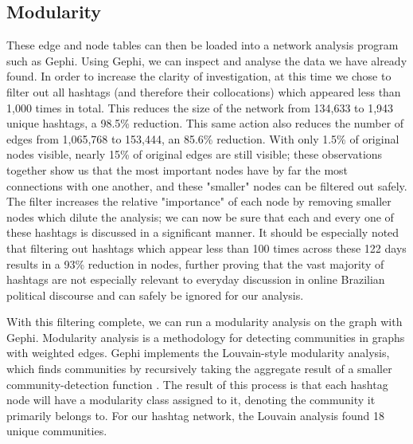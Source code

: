 \documentclass[a4paper,11pt]{article}  %
\begin{document}
	\subsection{Modularity}
	\label{subsec:modularity}
	These edge and node tables can then be loaded into a network analysis program such as Gephi\parencite{GephiOpenGraph}. Using Gephi, we can inspect and analyse the data we have already found. In order to increase the clarity of investigation, at this time we chose to filter out all hashtags (and therefore their collocations) which appeared less than 1,000 times in total. This reduces the size of the network from 134,633 to 1,943 unique hashtags, a 98.5\% reduction. This same action also reduces the number of edges from 1,065,768 to 153,444, an 85.6\% reduction. With only 1.5\% of original nodes visible, nearly 15\% of original edges are still visible; these observations together show us that the most important nodes have by far the most connections with one another, and these "smaller" nodes can be filtered out safely. The filter increases the relative "importance" of each node by removing smaller nodes which dilute the analysis; we can now be sure that each and every one of these hashtags is discussed in a significant manner. It should be especially noted that filtering out hashtags which appear less than 100 times across these 122 days results in a 93\% reduction in nodes, further proving that the vast majority of hashtags are not especially relevant to everyday discussion in online Brazilian political discourse and can safely be ignored for our analysis.
	
	With this filtering complete, we can run a modularity analysis on the graph with Gephi. Modularity analysis is a methodology for detecting communities in graphs with weighted edges. Gephi implements the Louvain-style modularity analysis, which finds communities by recursively taking the aggregate result of a smaller community-detection function \parencite{Findcommunities}. The result of this process is that each hashtag node will have a modularity class assigned to it, denoting the community it primarily belongs to. For our hashtag network, the Louvain analysis found 18 unique communities.
\end{document}
